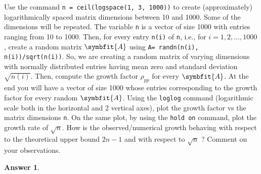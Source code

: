 \documentclass{article}
\theoremstyle{definition}
\newtheorem*{answer}{Answer}
\newcommand{\mat}[1]{\symbfit{#1}}
\begin{document}
\begin{enumerate}[leftmargin=\labelsep]
	      Use the command \texttt{n = ceil(logspace(1, 3, 1000))} to create (approximately) logarithmically spaced matrix dimensions between 10 and 1000. Some of the dimensions will be repeated. The variable \texttt{n} is a vector of size 1000 with entries ranging from 10 to 1000. Then, for every entry \texttt{n(i)} of \texttt{n}, i.e., for \(i = 1, 2, \dots , 1000\), create a random matrix \(\mat{A}\) using \texttt{A= randn(n(i), n(i))/sqrt(n(i))}. So, we are creating a random matrix of varying dimensions with normally distributed entries having mean zero and standard deviation \(\sqrt{n(i)}\). Then, compute the growth factor \(\rho_{pp}\) for every \(\mat{A}\). At the end you will have a vector of size 1000 whose entries corresponding to the growth factor for every random \(\mat{A}\). Using the \texttt{loglog} command (logarithmic scale both in the horizontal and 2 vertical axes), plot the growth factor vs the matrix dimensions \texttt{n}. On the same plot, by using the \texttt{hold on} command, plot the growth rate of \(\sqrt{n}\). How is the observed/numerical growth behaving with respect to the theoretical upper bound \(2n-1\) and with respect to \(\sqrt{n}\) ? Comment on your observations.
	      \begin{answer}
	      \end{answer}
\end{enumerate}
\end{document}
